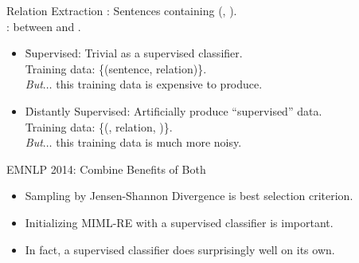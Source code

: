 \begin{frame}{Relation Extraction}
  :  Sentences containing (, ). \\
  :  between  and .
  \pause
  \vspace{1cm}

   \begin{itemize}
    \item \h{Supervised:} Trivial as a supervised classifier. \\
      Training data: \{(sentence, relation)\}. \\
      \textit{But}$\dots$ \pause this training data is expensive to produce.
    \pause
    \vspace{0.5cm}
  
    \item \h{Distantly Supervised:} Artificially produce ``supervised'' data. \\
      Training data: \{(, relation, )\}. \\
      \textit{But}$\dots$ \pause this training data is much more noisy.
  \end{itemize}
\end{frame}

\begin{frame}{EMNLP 2014: Combine Benefits of Both}
\begin{center}
\end{center}
\pause

\begin{itemize}
  \itemsep1em
  \item Sampling by Jensen-Shannon Divergence is best selection criterion.
  \pause
  \item Initializing MIML-RE with a supervised classifier is important.
  \pause
  \item In fact, a supervised classifier does surprisingly well on its own.
\end{itemize}

\end{frame}

